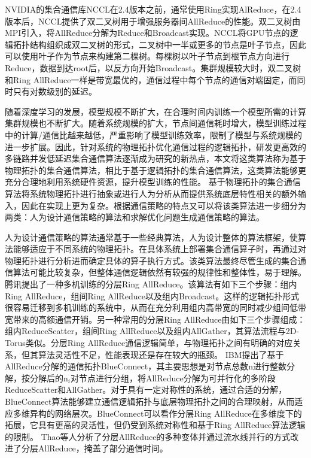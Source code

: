 NVIDIA的集合通信库NCCL在2.4版本之前，通常使用Ring实现AlReduce，在2.4版本后，NCCL提供了双二叉树用于增强服务器间AllReduce的性能。双二叉树由MPI引入\cite{sanders2009two}，将AllReduce分解为Reduce和Broadcast实现。NCCL将GPU节点的逻辑拓扑结构组织成双二叉树的形式，二叉树中一半或更多的节点是叶子节点，因此可以使用叶子作为节点来构建第二棵树。每棵树以叶子节点到根节点方向进行Reduce，数据到达root后，以反方向开始Broadcast。集群规模较大时，双二叉树和Ring AllReduce一样是带宽最优的，通信过程中每个节点的通信对端固定，而同时只有对数级别的延迟。

随着深度学习的发展，模型规模不断扩大，在合理时间内训练一个模型所需的计算集群规模也不断扩大。随着系统规模的扩大，节点间通信耗时增大，模型训练过程中的计算/通信比越来越低，严重影响了模型训练效率，限制了模型与系统规模的进一步扩展。因此，针对系统的物理拓扑优化通信过程的逻辑拓扑，研发更高效的多链路并发低延迟集合通信算法逐渐成为研究的新热点，本文将这类算法称为基于物理拓扑的集合通信算法，相比于基于逻辑拓扑的集合通信算法，这类算法能够更充分合理地利用系统硬件资源，提升模型训练的性能。
基于物理拓扑的集合通信算法将系统物理拓扑进行抽象或进行人为分析从而提供系统底层特性相关的额外输入，因此在实现上更为复杂。根据通信策略的特点又可以将该类算法进一步细分为两类：人为设计通信策略的算法和求解优化问题生成通信策略的算法。

人为设计通信策略的算法通常基于一些经典算法，人为设计整体的算法框架，使算法能够适应于不同系统的物理拓扑。在具体系统上部署集合通信算子时，再通过对物理拓扑进行分析进而确定具体的算子执行方式。该类算法最终尽管生成的集合通信算法可能比较复杂，但整体通信逻辑依然有较强的规律性和整体性，易于理解。
腾讯提出了一种多机训练的分层Ring AllReduce\cite{jia2018highly}。该算法有如下三个步骤：组内Ring AllReduce，组间Ring AllReduce以及组内Broadcast。这样的逻辑拓扑形式很容易迁移到多机训练的系统中，从而在充分利用组内高带宽的同时减少组间低带宽带来的高额通信开销。另一种常用的分层Ring AllReduce由如下三个步骤组成：组内ReduceScatter，组间Ring AllReduce以及组内AllGather，其算法流程与2D-Torus类似。分层Ring AllReduce通信逻辑简单，与物理拓扑之间有明确的对应关系，但其算法灵活性不足，性能表现还是存在较大的瓶颈。
IBM提出了基于AllReduce分解的通信拓扑BlueConnect\cite{cho2019blueconnect}，其主要思想是对节点总数$\mathrm{n}$进行整数分解，按分解后的$\mathrm{n}_i$对节点进行分组，将AllReduce分解为可并行化的多阶段ReduceScatter和AllGather。对于具有一定对称性的系统，通过合适的分解，BlueConnect算法能够建立通信逻辑拓扑与底层物理拓扑之间的合理映射，从而适应多维异构的网络层次。BlueConnect可以看作分层Ring AllReduce在多维度下的拓展，它具有更高的灵活性，但仍受到系统对称性和基于Ring AllReduce算法逻辑的限制。
Thao等人\cite{thao2021efficient}分析了分层AllReduce的多种变体并通过流水线并行的方式改进了分层AllReduce，掩盖了部分通信时间。


